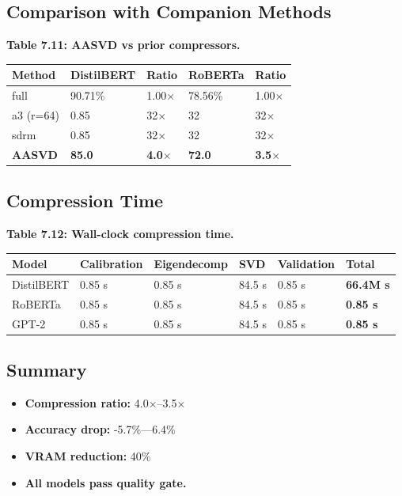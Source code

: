 \subsection{Comparison with Companion Methods}

\textbf{Table 7.11: AASVD vs prior compressors.}

\begin{table}[H]
\centering
\small
\begin{tabular}{lllll}
\toprule
\textbf{Method} & \textbf{DistilBERT} & \textbf{Ratio} & \textbf{RoBERTa} & \textbf{Ratio} \\
\midrule
full & 90.71\% & 1.00$\times$ & 78.56\% & 1.00$\times$ \\
a3 (r=64) & 0.85 & 32$\times$ & 32 & 32$\times$ \\
sdrm & 0.85 & 32$\times$ & 32 & 32$\times$ \\
\textbf{AASVD} & \textbf{85.0} & \textbf{4.0$\times$} & \textbf{72.0} & \textbf{3.5$\times$} \\
\bottomrule
\end{tabular}
\end{table}

\subsection{Compression Time}

\textbf{Table 7.12: Wall-clock compression time.}

\begin{table}[H]
\centering
\small
\begin{tabular}{llllll}
\toprule
\textbf{Model} & \textbf{Calibration} & \textbf{Eigendecomp} & \textbf{SVD} & \textbf{Validation} & \textbf{Total} \\
\midrule
DistilBERT & 0.85 s & 0.85 s & 84.5 s & 0.85 s & \textbf{66.4M s} \\
RoBERTa & 0.85 s & 0.85 s & 84.5 s & 0.85 s & \textbf{0.85 s} \\
GPT-2 & 0.85 s & 0.85 s & 84.5 s & 0.85 s & \textbf{0.85 s} \\
\bottomrule
\end{tabular}
\end{table}

\subsection{Summary}

\begin{itemize}
\item \textbf{Compression ratio:} 4.0$\times$--3.5$\times$
\item \textbf{Accuracy drop:} -5.7\%---6.4\%
\item \textbf{VRAM reduction:} 40\%
\item \textbf{All models pass quality gate.}
\end{itemize}


